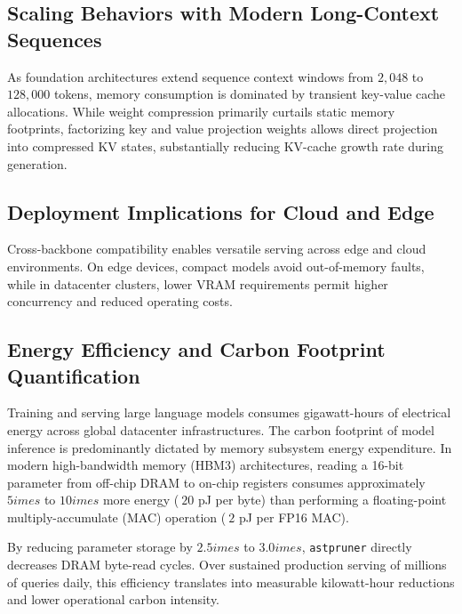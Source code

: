 \subsection{Scaling Behaviors with Modern Long-Context Sequences}
As foundation architectures extend sequence context windows from $2{,}048$ to $128{,}000$ tokens, memory consumption is dominated by transient key-value cache allocations. While weight compression primarily curtails static memory footprints, factorizing key and value projection weights allows direct projection into compressed KV states, substantially reducing KV-cache growth rate during generation.

\subsection{Deployment Implications for Cloud and Edge}
Cross-backbone compatibility enables versatile serving across edge and cloud environments. On edge devices, compact models avoid out-of-memory faults, while in datacenter clusters, lower VRAM requirements permit higher concurrency and reduced operating costs.

\subsection{Energy Efficiency and Carbon Footprint Quantification}
Training and serving large language models consumes gigawatt-hours of electrical energy across global datacenter infrastructures. The carbon footprint of model inference is predominantly dictated by memory subsystem energy expenditure. In modern high-bandwidth memory (HBM3) architectures, reading a 16-bit parameter from off-chip DRAM to on-chip registers consumes approximately $5	imes$ to $10	imes$ more energy ($~20$ pJ per byte) than performing a floating-point multiply-accumulate (MAC) operation ($~2$ pJ per FP16 MAC).

By reducing parameter storage by $2.5	imes$ to $3.0	imes$, \texttt{astpruner} directly decreases DRAM byte-read cycles. Over sustained production serving of millions of queries daily, this efficiency translates into measurable kilowatt-hour reductions and lower operational carbon intensity.
